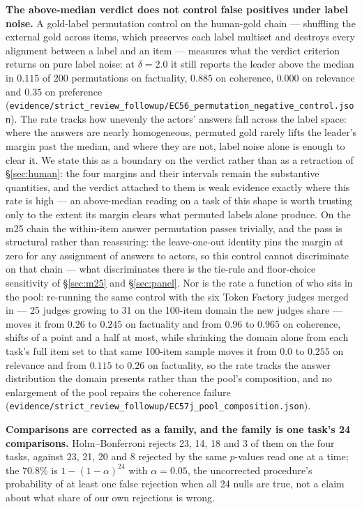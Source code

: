 \documentclass{article}
\newcommand{\ids}[1]{\texttt{\small #1}} %
\begin{document}
\textbf{The above-median verdict does not control false positives under label noise.} A gold-label permutation control on the human-gold chain --- shuffling the external gold across items, which preserves each label multiset and destroys every alignment between a label and an item --- measures what the verdict criterion returns on pure label noise: at $\delta = 2.0$ it still reports the leader above the median in $0.115$ of $200$ permutations on factuality, $0.885$ on coherence, $0.000$ on relevance and $0.35$ on preference (\ids{evidence/strict\_review\_followup/EC56\_permutation\_negative\_control.json}). The rate tracks how unevenly the actors' answers fall across the label space: where the answers are nearly homogeneous, permuted gold rarely lifts the leader's margin past the median, and where they are not, label noise alone is enough to clear it. We state this as a boundary on the verdict rather than as a retraction of \S\ref{sec:human}: the four margins and their intervals remain the substantive quantities, and the verdict attached to them is weak evidence exactly where this rate is high --- an above-median reading on a task of this shape is worth trusting only to the extent its margin clears what permuted labels alone produce. On the m25 chain the within-item answer permutation passes trivially, and the pass is structural rather than reassuring: the leave-one-out identity pins the margin at zero for any assignment of answers to actors, so this control cannot discriminate on that chain --- what discriminates there is the tie-rule and floor-choice sensitivity of \S\ref{sec:m25} and \S\ref{sec:panel}. Nor is the rate a function of who sits in the pool: re-running the same control with the six Token Factory judges merged in --- 25 judges growing to 31 on the 100-item domain the new judges share --- moves it from $0.26$ to $0.245$ on factuality and from $0.96$ to $0.965$ on coherence, shifts of a point and a half at most, while shrinking the domain alone from each task's full item set to that same 100-item sample moves it from $0.0$ to $0.255$ on relevance and from $0.115$ to $0.26$ on factuality, so the rate tracks the answer distribution the domain presents rather than the pool's composition, and no enlargement of the pool repairs the coherence failure (\ids{evidence/strict\_review\_followup/EC57j\_pool\_composition.json}).

\textbf{Comparisons are corrected as a family, and the family is one task's 24 comparisons.} Holm--Bonferroni rejects 23, 14, 18 and 3 of them on the four tasks, against 23, 21, 20 and 8 rejected by the same $p$-values read one at a time; the $70.8\%$ is $1-(1-\alpha)^{24}$ with $\alpha=0.05$, the uncorrected procedure's probability of at least one false rejection when all 24 nulls are true, not a claim about what share of our own rejections is wrong.
\end{document}
